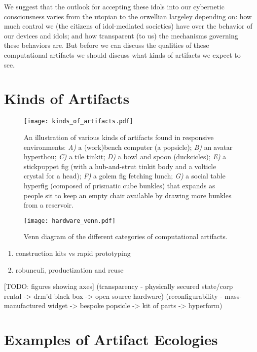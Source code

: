 We suggest that the outlook for accepting these idols into our cybernetic consciousness varies from the utopian to the orwellian largeley depending on: how much control we (the citizens of idol-mediated societies) have over the behavior of our devices and idols; and how transparent (to us) the mechanisms governing these behaviors are. But before we can discuss the qualities of these computational artifacts we should discuss what kinds of artifacts we expect to see.

\section{Kinds of Artifacts}
\label{sec:kinds_of_artifacts}
%
\begin{figure}[h!]
  \centering
    \texttt{[image: kinds\_of\_artifacts.pdf]}
  \caption{An illustration of various kinds of artifacts found in responsive environments: \emph{A)} a (work)bench computer (a popsicle); \emph{B)} an avatar hyperthou; \emph{C)} a tile tinkit; \emph{D)} a bowl and spoon (duckcicles); \emph{E)} a stickpuppet fig (with a hub-and-strut tinkit body and a volticle crystal for a head); \emph{F)} a golem fig fetching lunch; \emph{G)} a social table hyperfig (composed of prismatic cube bunkles) that expands as people sit to keep an empty chair available by drawing more bunkles from a reservoir.}
  \label{fig:kinds_of_artifacts}
\end{figure}
%


\begin{figure}[tb]
  \centering
    \texttt{[image: hardware\_venn.pdf]}
  \caption{Venn diagram of the different categories of computational artifacts.}
  \label{fig:hardware_venn}
\end{figure}

    \begin{enumerate}
        \item construction kits vs rapid prototyping
        \item robunculi, productization and reuse
    \end{enumerate}


[TODO: figures showing axes] (transparency - physically secured state/corp rental -> drm'd black box -> open source hardware) (reconfigurability - mass-manufactured widget -> bespoke popsicle -> kit of parts -> hyperform)


\section{Examples of Artifact Ecologies}
\label{sec:artifact_ecologies}
%
